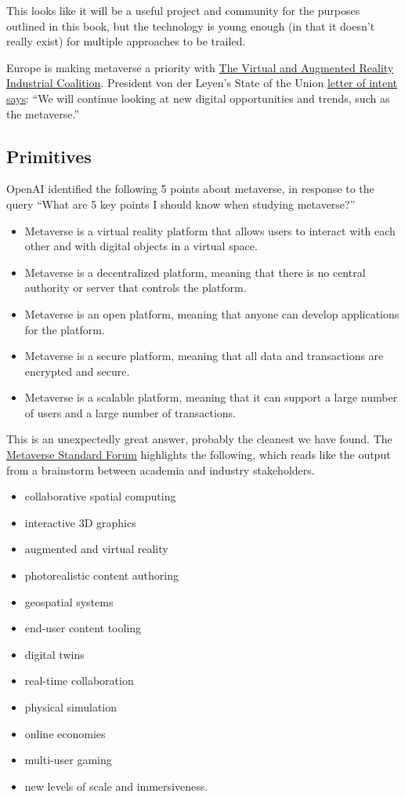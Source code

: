 This looks like it will be a useful project and community for the purposes outlined in this book, but the technology is young enough (in that it doesn't really exist) for multiple approaches to be trailed.\par
Europe is making metaverse a priority with \href{https://digital-strategy.ec.europa.eu/en/policies/virtual-and-augmented-reality-coalition}{The Virtual and Augmented Reality Industrial Coalition}. President von der Leyen’s State of the Union \href{https://state-of-the-union.ec.europa.eu/system/files/2022-09/SOTEU_2022_Letter_of_Intent_EN_0.pdf}{letter of intent says}:  ``We will continue looking at new digital opportunities and trends, such as the metaverse.'' 
\subsection{Primitives}
OpenAI identified the following 5 points about metaverse, in response to the query ``What are 5 key points I should know when studying metaverse?''
\begin{itemize}
\item Metaverse is a virtual reality platform that allows users to interact with each other and with digital objects in a virtual space.
\item Metaverse is a decentralized platform, meaning that there is no central authority or server that controls the platform.
\item Metaverse is an open platform, meaning that anyone can develop applications for the platform.
\item Metaverse is a secure platform, meaning that all data and transactions are encrypted and secure.
\item Metaverse is a scalable platform, meaning that it can support a large number of users and a large number of transactions.
\end{itemize}
This is an unexpectedly great answer, probably the cleanest we have found. The \href{https://metaverse-standards.org/}{Metaverse Standard Forum} highlights the following, which reads like the output from a brainstorm between academia and industry stakeholders.
\begin{itemize}
\item collaborative spatial computing
\item interactive 3D graphics 
\item augmented and virtual reality
\item photorealistic content authoring
\item geospatial systems
\item end-user content tooling
\item digital twins
\item real-time collaboration
\item physical simulation
\item online economies
\item multi-user gaming
\item new levels of scale and immersiveness. 
\end{itemize}
